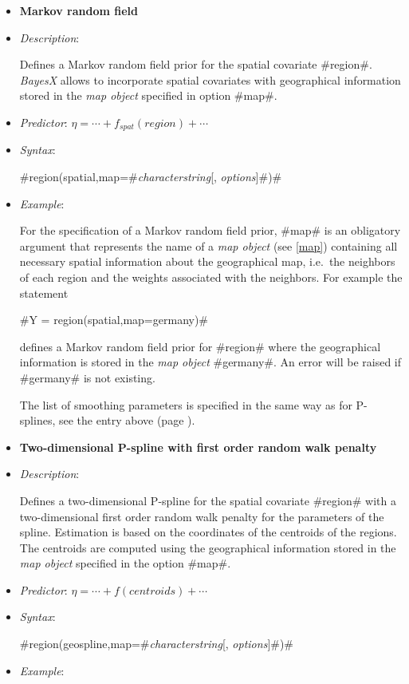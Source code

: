 \begin{itemize}
\item[]{\bf\sffamily Markov random field}

\item[] {\em Description}:

Defines a Markov random field prior for the spatial covariate
#region#. {\em BayesX} allows to incorporate spatial covariates
with geographical information stored in the {\em map object}
specified in option #map#.
\item[] {\em Predictor}: $\eta = \cdots
+ f_{spat}(region) + \cdots$ \item[] {\em Syntax}:

#region(spatial,map=#{\em characterstring}[, {\em options}]#)#
\item[] {\em Example}:

For the specification of a Markov random field prior, #map# is an
obligatory argument that represents the name of a {\em map object}
(see \autoref{map}) containing all necessary spatial information
about the geographical map, i.e.~the neighbors of each region and
the weights associated with the neighbors. For example the
statement

#Y = region(spatial,map=germany)#

defines a Markov random field prior for #region# where the
geographical information is stored in the {\em map object}
#germany#. An error will be raised if #germany# is not existing.

The list of smoothing parameters is specified in the same way as for P-splines, see the entry above (page \pageref{psplines_stepwise}).

\item[]{\bf\sffamily Two-dimensional P-spline with first order
random walk penalty}

\item[] {\em Description}:

Defines a two-dimensional P-spline for the spatial covariate
#region# with a two-dimensional first order random walk penalty
for the parameters of the spline. Estimation is based on the
coordinates of the centroids of the regions. The centroids are
computed using the geographical information stored in the {\em map
object} specified in the option #map#.
\item[] {\em Predictor}:
$\eta= \cdots + f(centroids) + \cdots$ \item[] {\em Syntax}:

#region(geospline,map=#{\em characterstring}[, {\em options}]#)#
\item[] {\em Example}:


\end{itemize}
